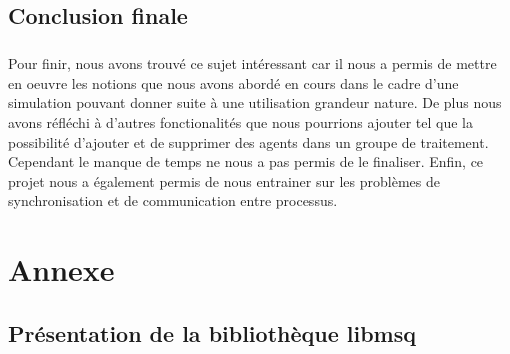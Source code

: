 \documentclass{report}
\begin{document}
	\section{Conclusion finale}
		\paragraph{}
			Pour finir, nous avons trouvé ce sujet intéressant car il nous a permis de mettre en oeuvre les notions que nous avons abordé en cours dans le cadre d'une simulation pouvant donner suite à une utilisation grandeur nature. De plus nous avons réfléchi à d'autres fonctionalités que nous pourrions ajouter tel que la possibilité d'ajouter et de supprimer des agents dans un groupe de traitement. Cependant le manque de temps ne nous a pas permis de le finaliser. Enfin, ce projet nous a également permis de nous entrainer sur les problèmes de synchronisation et de communication entre processus. 

\chapter{Annexe}
	\section{Présentation de la bibliothèque libmsq}
\end{document}
